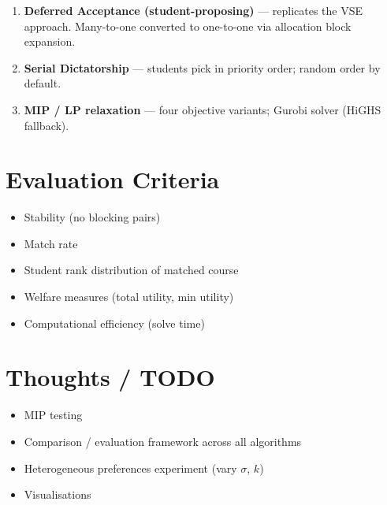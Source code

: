 \documentclass[11pt]{article}
\begin{document}
\begin{enumerate}
    \item \textbf{Deferred Acceptance (student-proposing)} --- replicates the VSE approach.
          Many-to-one converted to one-to-one via allocation block expansion.
    \item \textbf{Serial Dictatorship} --- students pick in priority order; random order by default.
    \item \textbf{MIP / LP relaxation} --- four objective variants; Gurobi solver (HiGHS fallback).
\end{enumerate}

\section{Evaluation Criteria}

\begin{itemize}
    \item Stability (no blocking pairs)
    \item Match rate
    \item Student rank distribution of matched course
    \item Welfare measures (total utility, min utility)
    \item Computational efficiency (solve time)
\end{itemize}

\section{Thoughts / TODO}

\begin{itemize}
    \item[$\square$] MIP testing
    \item[$\square$] Comparison / evaluation framework across all algorithms
    \item[$\square$] Heterogeneous preferences experiment (vary $\sigma$, $k$)
    \item[$\square$] Visualisations
\end{itemize}
\end{document}
